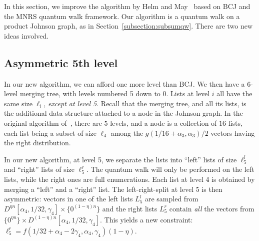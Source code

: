 

In this section, we improve the algorithm by Helm and May~\cite{DBLP:conf/tqc/HelmM18} based on BCJ and the MNRS quantum walk framework. Our algorithm is a quantum walk on a product Johnson graph, as in Section~\ref{subsection:subsumqw}. There are two new ideas involved.



\subsection{Asymmetric 5th level}

In our new algorithm, we can afford one more level than BCJ. We then have a 6-level merging tree, with levels numbered 5 down to 0. Lists at level $i$ all have the same size $\ell_i$, \emph{except at level 5}. Recall that the merging tree, and all its lists, is the additional data structure attached to a node in the Johnson graph. In the original algorithm of~\cite{DBLP:conf/tqc/HelmM18}, there are 5 levels, and a node is a collection of $16$ lists, each list being a subset of size $\ell_4$ among the $g(1/16+\alpha_3,\alpha_3)/2$ vectors having the right distribution.



In our new algorithm, at level 5, we separate the lists into ``left'' lists of size $\ell_5^l$ and ``right'' lists of size $\ell_5^r$. The quantum walk will only be performed on the left lists, while the right ones are full enumerations. Each list at level 4 is obtained by merging a ``left'' and a ``right'' list. The left-right-split at level 5 is then asymmetric: vectors in one of the left lists $L_5^l$ are sampled from $D^{\eta n}[\alpha_4, 1/32, \gamma_4] \times \{0^{(1 -\eta) n}\}$ and the right lists $L_5^r$ contain \emph{all} the vectors from $\{0^{\eta n}\} \times D^{(1-\eta) n}[\alpha_4, 1/32, \gamma_4]$. This yields a new constraint: $\ell_5^r = f(1/32+\alpha_4-2\gamma_4, \alpha_4, \gamma_4) (1 - \eta)$.


